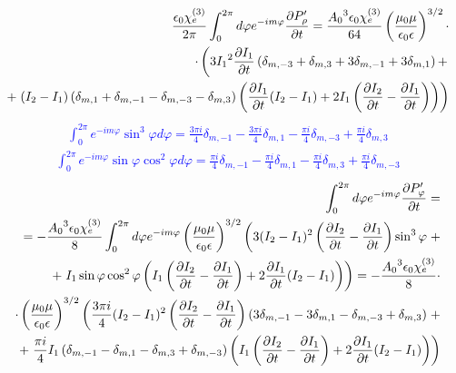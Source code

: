 %
\begin{equation*} \begin{aligned}
\frac{\epsilon_0 \chi_e^{(3)}}{2 \pi} \int_{0}^{2\pi} d \varphi 
e^{-im \varphi} \frac{\partial P_\rho^\prime}{\partial t} = 
\frac{ {A_0}^3 \epsilon_0 \chi_e^{(3)}}{ 64 } 
\left( \frac{\mu_0 \mu} {\epsilon_0 \epsilon} \right)^{3/2} \cdot \\ 
\cdot \left( 3 {I_1}^2 \frac{\partial I_1}{\partial t} \left( \delta_{m,-3} + 
\delta_{m,3} + 3 \delta_{m,-1} + 3 \delta_{m,1} \right) + \right. \\
+ \left. ( I_2 - I_1 ) \left( \delta_{m,1} + \delta_{m,-1} - 
\delta_{m,-3} - \delta_{m,3} \right) \left( 
\frac{\partial I_1}{\partial t} ( I_2 - I_1 ) + 2 I_1 \left( \frac{\partial I_2}{\partial t} - 
\frac{\partial I_1}{\partial t} \right) \right) \right)
\end{aligned} \end{equation*}
%
\textcolor{blue} { \begin{equation*} \begin{aligned}
\int_{0}^{2\pi} e^{-i m \varphi} \sin^3 \varphi d \varphi = 
\frac{3 \pi i}{4} \delta_{m,-1} - \frac{3 \pi i}{4} \delta_{m,1} - 
\frac{\pi i}{4} \delta_{m,-3} + \frac{\pi i}{4} \delta_{m,3}
\end{aligned} \end{equation*} }
%
\textcolor{blue} { \begin{equation*} \begin{aligned}
\int_0^{2\pi} e^{-i m \varphi} \sin \varphi \cos^2 \varphi d \varphi = 
\frac{\pi i }{4} \delta_{m,-1} - \frac{\pi i }{4} \delta_{m,1} -
\frac{\pi i }{4} \delta_{m,3} + \frac{\pi i }{4} \delta_{m,-3}
\end{aligned} \end{equation*} }
%
\textcolor{blue} { \begin{equation*} \begin{aligned}
\int_{0}^{2 \pi} d \varphi e^{-im \varphi} \frac{\partial P_\varphi^\prime}{\partial t} = \\
= - \frac{ {A_0}^3 \epsilon_0 \chi_e^{(3)} }{ 8 } 
\int_{0}^{2 \pi} d \varphi e^{-im \varphi}
\left( \frac{\mu_0 \mu} {\epsilon_0 \epsilon} \right)^{3/2} \left(
3 ( I_2 - I_1 )^2 \left( \frac{\partial I_2}{\partial t} - \frac{\partial I_1}{\partial t} \right)
\sin^3 \varphi \right. + \\
+ \left. I_1 \sin \varphi \cos^2 \varphi \left( 
I_1 \left( \frac{\partial I_2}{\partial t} - \frac{\partial I_1}{\partial t} \right) + 
2 \frac{\partial I_1}{\partial t} (I_2 - I_1) \right) \right) = 
- \frac{ {A_0}^3 \epsilon_0 \chi_e^{(3)} }{ 8 } \cdot \\ 
\cdot \left( \frac{\mu_0 \mu} {\epsilon_0 \epsilon} \right)^{3/2} \left(
\frac{3 \pi i}{4} ( I_2 - I_1 )^2 \left( \frac{\partial I_2}{\partial t} - 
\frac{\partial I_1}{\partial t} \right) \left( 3 \delta_{m,-1} - 3 \delta_{m,1} - 
\delta_{m,-3} + \delta_{m,3} \right) \right. + \\
+ \left. \frac{\pi i}{4} I_1 \left( \delta_{m,-1} - \delta_{m,1} - 
\delta_{m,3} + \delta_{m,-3} \right) \left( 
I_1 \left( \frac{\partial I_2}{\partial t} - \frac{\partial I_1}{\partial t} \right) + 
2 \frac{\partial I_1}{\partial t} (I_2 - I_1) \right) \right)
\end{aligned} \end{equation*} }
